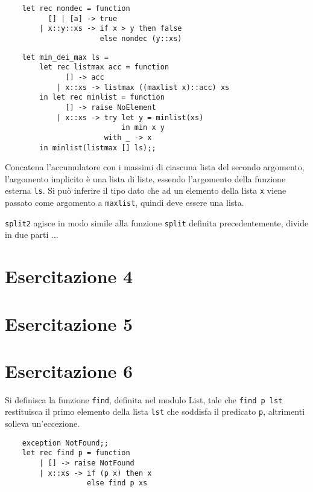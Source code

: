 \documentclass{article}
\numberwithin{equation}{subsection}
\begin{document}
\begin{verbatim}
    let rec nondec = function
          [] | [a] -> true
        | x::y::xs -> if x > y then false
                      else nondec (y::xs)
\end{verbatim}



\begin{verbatim}
    let min_dei_max ls = 
        let rec listmax acc = function
              [] -> acc
            | x::xs -> listmax ((maxlist x)::acc) xs
        in let rec minlist = function
              [] -> raise NoElement
            | x::xs -> try let y = minlist(xs)
                           in min x y
                       with _ -> x
        in minlist(listmax [] ls);;
\end{verbatim}

Concatena l'accumulatore con i massimi di ciascuna lista del secondo argomento, l'argomento implicito è una lista di liste, essendo l'argomento della funzione esterna \verb|ls|. Si può inferire il tipo dato che ad un elemento della lista \verb|x| viene passato come argomento a \verb|maxlist|, quindi deve essere una lista. 



\verb|split2| agisce in modo simile alla funzione \verb|split| definita precedentemente, divide in due parti ...

\clearpage

\section{Esercitazione 4}

\clearpage

\section{Esercitazione 5}

\clearpage

\section{Esercitazione 6}

Si definisca la funzione \verb|find|, definita nel modulo List, tale che \verb|find p lst| restituisca il primo elemento della lista \verb|lst| che soddisfa il predicato \verb|p|, altrimenti solleva un'eccezione. 
\begin{verbatim}
    exception NotFound;;
    let rec find p = function
        | [] -> raise NotFound
        | x::xs -> if (p x) then x
                   else find p xs
\end{verbatim}
\end{document}
